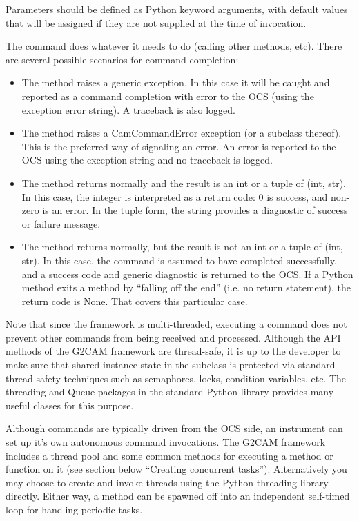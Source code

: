 \documentclass[11pt]{report}
\begin{document}
Parameters should be defined as Python keyword arguments, with default
values that will be assigned if they are not supplied at the time of
invocation. 

The command does whatever it needs to do (calling other methods,
etc). There are several possible scenarios for command completion: 
\begin{itemize}
\item The method raises a generic exception. In this case it will be
caught and reported as a command completion with error to the OCS (using
the exception error string). A traceback is also logged. 

\item The method raises a CamCommandError exception (or a subclass
thereof). This is the preferred way of signaling an error. An error is
reported to the OCS using the exception string and no traceback is
logged. 

\item The method returns normally and the result is an int or a tuple of
(int, str). In this case, the integer is interpreted as a return code: 0
is success, and non-zero is an error. In the tuple form, the string
provides a diagnostic of success or failure message. 

\item The method returns normally, but the result is not an int or a
tuple of (int, str). In this case, the command is assumed to have
completed successfully, and a success code and generic diagnostic is
returned to the OCS. If a Python method exits a method by ``falling off
the end'' (i.e. no return statement), the return code is None.
That covers this particular case. 
\end{itemize}
Note that since the framework is multi-threaded, executing a command
does not prevent other commands from being received and processed.
Although the API methods of the G2CAM framework are thread-safe, it is
up to the developer to make sure that shared instance 
state in the subclass is protected via standard thread-safety techniques
such as semaphores, locks, condition variables, etc. 
The threading and Queue packages in the standard Python library provides
many useful classes for this purpose. 

Although commands are typically driven from the OCS side, an instrument
can set up it's own autonomous command invocations. 
The G2CAM framework includes a thread pool and some common methods for
executing a method or function on it (see section below ``Creating
concurrent tasks'').
Alternatively you may choose to create and invoke threads using
the Python threading library directly. Either way, a method can be
spawned off into an independent self-timed loop for handling periodic
tasks. 
\end{document}
